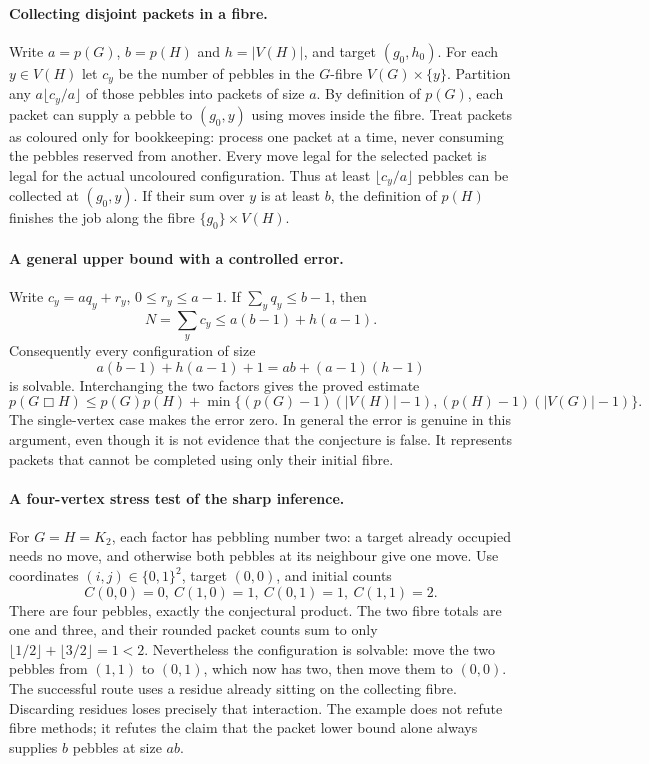 \documentclass[11pt,a4paper]{article}
\begin{document}
\paragraph{Collecting disjoint packets in a fibre.}
Write $a=p(G)$, $b=p(H)$ and $h=|V(H)|$, and target $(g_0,h_0)$.
For each $y\in V(H)$ let $c_y$ be the number of pebbles in the $G$-fibre
$V(G)\times\{y\}$. Partition any $a\lfloor c_y/a\rfloor$ of those pebbles
into packets of size $a$. By definition of $p(G)$, each packet can supply a
pebble to $(g_0,y)$ using moves inside the fibre. Treat packets as coloured
only for bookkeeping: process one packet at a time, never consuming the
pebbles reserved from another. Every move legal for the selected packet is
legal for the actual uncoloured configuration. Thus at least
$\lfloor c_y/a\rfloor$ pebbles can be collected at $(g_0,y)$.
If their sum over $y$ is at least $b$, the definition of $p(H)$ finishes the
job along the fibre $\{g_0\}\times V(H)$.

\paragraph{A general upper bound with a controlled error.}
Write $c_y=aq_y+r_y$, $0\le r_y\le a-1$. If $\sum_yq_y\le b-1$, then
\[
 N=\sum_yc_y\le a(b-1)+h(a-1).
\]
Consequently every configuration of size
\[
 a(b-1)+h(a-1)+1=ab+(a-1)(h-1)
\]
is solvable. Interchanging the two factors gives the proved estimate
\[
 p(G\mathbin\Box H)\le p(G)p(H)+
 \min\{(p(G)-1)(|V(H)|-1),(p(H)-1)(|V(G)|-1)\}.
\]
The single-vertex case makes the error zero. In general the error is genuine
in this argument, even though it is not evidence that the conjecture is false.
It represents packets that cannot be completed using only their initial fibre.

\paragraph{A four-vertex stress test of the sharp inference.}
For $G=H=K_2$, each factor has pebbling number two: a target already occupied
needs no move, and otherwise both pebbles at its neighbour give one move.
Use coordinates $(i,j)\in\{0,1\}^2$, target $(0,0)$, and initial counts
\[
 C(0,0)=0,\ C(1,0)=1,\ C(0,1)=1,\ C(1,1)=2.
\]
There are four pebbles, exactly the conjectural product. The two fibre totals
are one and three, and their rounded packet counts sum to only
$\lfloor1/2\rfloor+\lfloor3/2\rfloor=1<2$.
Nevertheless the configuration is solvable: move the two pebbles from
$(1,1)$ to $(0,1)$, which now has two, then move them to $(0,0)$.
The successful route uses a residue already sitting on the collecting fibre.
Discarding residues loses precisely that interaction. The example does not
refute fibre methods; it refutes the claim that the packet lower bound alone
always supplies $b$ pebbles at size $ab$.
\end{document}
